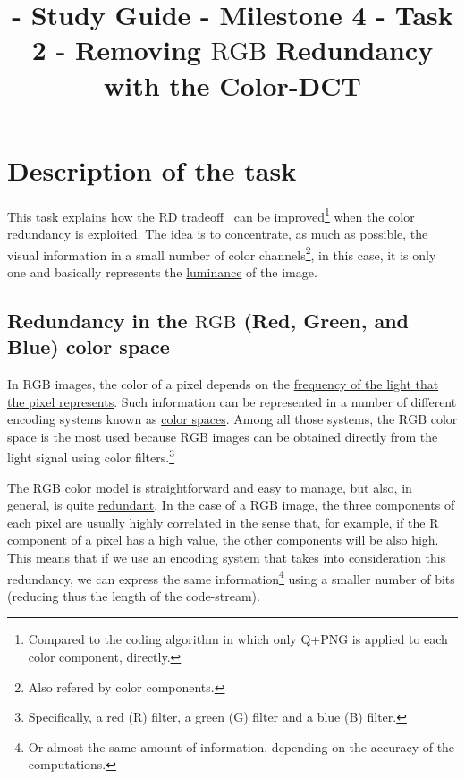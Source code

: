 

\title{\SM{} - Study Guide - Milestone 4 - Task 2 - Removing $\text{RGB}$ Redundancy with the Color-DCT}

\maketitle

\tableofcontents

\section{Description of the task}

This task explains how the RD
tradeoff~\cite{vruiz__information_theory} can be
improved\footnote{Compared to the coding algorithm in which only Q+PNG
is applied to each color component, directly.} when the color
redundancy is exploited. The idea is to concentrate, as much as
possible, the visual information in a small number of color
channels\footnote{Also refered by color components.}, in this case, it
is only one and basically represents the
\href{https://en.wikipedia.org/wiki/Luminance}{luminance} of the
image.


\subsection{Redundancy in the $\text{RGB}$ (Red, Green, and Blue) color space}

In $\text{RGB}$ images, the color of a pixel depends on the
\href{https://en.wikipedia.org/wiki/Visible_spectrum}{frequency of the
  light that the pixel represents}. Such information can be
represented in a number of different encoding systems known as
\href{https://en.wikipedia.org/wiki/Color_space}{color spaces}. Among
all those systems, the $\text{RGB}$ color space is the most used
because $\text{RGB}$ images can be obtained directly from the light
signal using color filters.\footnote{Specifically, a red (R) filter, a
green (G) filter and a blue (B) filter.}

The $\text{RGB}$ color model is straightforward and easy to manage,
but also, in general, is quite
\href{https://en.wikipedia.org/wiki/Data_redundancy}{redundant}. In
the case of a $\text{RGB}$ image, the three components of each pixel
are usually highly
\href{https://en.wikipedia.org/wiki/Correlation_and_dependence}{correlated}
in the sense that, for example, if the $\text{R}$ component of a pixel
has a high value, the other components will be also high. This means
that if we use an encoding system that takes into consideration this
redundancy, we can express the same information\footnote{Or almost the
same amount of information, depending on the accuracy of the
computations.} using a smaller number of bits (reducing thus the
length of the code-stream).

